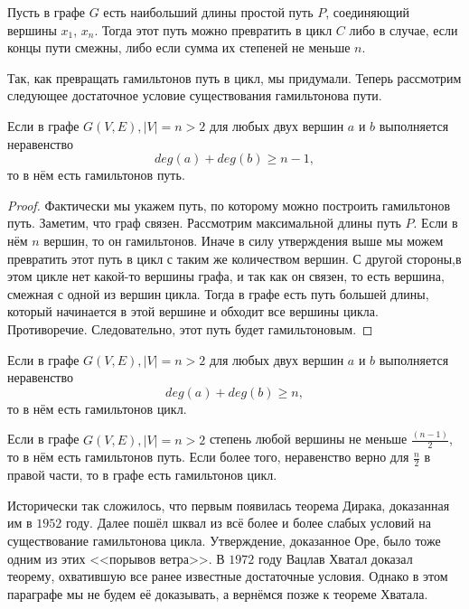 \begin{consequence}
	Пусть в графе $G$ есть наибольший длины простой путь $P$, соединяющий вершины $x_1$, $x_n$. Тогда этот путь можно превратить в цикл $C$ либо в случае, если концы пути смежны, либо если сумма их степеней не меньше $n$.
\end{consequence}

	Так, как превращать гамильтонов путь в цикл, мы придумали. Теперь рассмотрим следующее достаточное условие существования гамильтонова пути.
	
\begin{theorem}[Оре]
	Если в графе $G(V, E), |V| = n > 2$ для любых двух вершин $a$ и $b$ выполняется неравенство 
	$$deg (a) + deg (b) \geqslant n-1,$$
	то в нём есть гамильтонов путь.
	
\begin{proof}
	Фактически мы укажем путь, по которому можно построить гамильтонов путь. Заметим, что граф связен. Рассмотрим максимальной длины путь $P$. Если в нём $n$ вершин, то он гамильтонов. Иначе в силу утверждения выше мы можем превратить этот путь в цикл с таким же количеством вершин. С другой стороны,в этом цикле нет какой-то вершины графа, и так как он связен, то есть вершина, смежная с одной из вершин цикла. Тогда в графе есть путь большей длины, который начинается в этой вершине и обходит все вершины цикла. Противоречие. Следовательно, этот путь будет гамильтоновым.
\end{proof}
\end{theorem}

\begin{consequence}
	Если в графе $G(V, E), |V| = n > 2$ для любых двух вершин $a$ и $b$ выполняется неравенство 
	$$deg (a) + deg (b) \geqslant n,$$
	то в нём есть гамильтонов цикл.
\end{consequence}

\begin{consequence}[Дирак]
	Если в графе $G(V, E), |V| = n > 2$ степень любой вершины не меньше $\frac{(n-1)}{2}$, то в нём есть гамильтонов путь. Если более того, неравенство верно для $\frac{n}{2}$ в правой части, то в графе есть гамильтонов цикл.
\end{consequence}

	Исторически так сложилось, что первым появилась теорема Дирака, доказанная им в $1952$ году. Далее пошёл шквал из всё более и более слабых условий на существование гамильтонова цикла. Утверждение, доказанное Оре, было тоже одним из этих <<порывов ветра>>. В $1972$ году Вацлав Хватал доказал теорему, охватившую все ранее известные достаточные условия. Однако в этом параграфе мы не будем её доказывать, а вернёмся позже к теореме Хватала.

